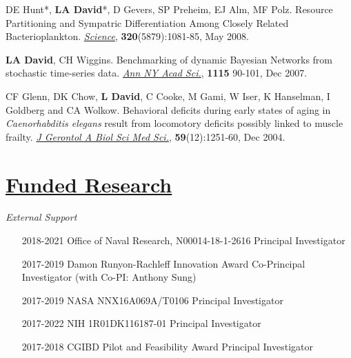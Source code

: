 \documentclass[overlapped,line,11pt]{res}
\begin{document}
\begin{resume}
\begin{revnumerate}[26]
\vspace*{1mm}
\item {DE Hunt*, \textbf{LA David}*, D Gevers, SP Preheim, EJ Alm, MF
Polz.  Resource Partitioning and Sympatric Differentiation Among
Closely Related Bacterioplankton.  \emph{\underline{Science}},
\textbf{320}(5879):1081-85, May 2008.}

\vspace*{1mm}
\item {\textbf{LA David}, CH Wiggins. Benchmarking of dynamic Bayesian
  Networks from stochastic time-series data. \emph{\underline{Ann NY Acad Sci.}},
  \textbf{1115} 90-101, Dec 2007.}

\vspace*{1mm}
\item {CF Glenn, DK Chow, \textbf{L David}, C Cooke, M Gami, W Iser, K
  Hanselman, I Goldberg and CA Wolkow. Behavioral deficits during
  early states of aging in {\em Caenorhabditis elegans} result from
  locomotory deficits possibly linked to muscle frailty. \emph{\underline{J
    Gerontol A Biol Sci Med Sci.}}, \textbf{59}(12):1251-60, Dec 2004.}
\end{revnumerate}

\section{\underline{\sc Funded Research}} 
\vspace{.1in}
\emph{External Support}
\vspace{.1in}

\begin{itemize}[leftmargin=2cm, style=sameline]

\item[2018-2021] Office of Naval Research, N00014-18-1-2616
  \newline Principal Investigator

\item[2017-2019] Damon Runyon-Rachleff Innovation Award 
  \newline Co-Principal Investigator (with Co-PI:
  Anthony Sung)

\item[2017-2019] NASA NNX16A069A/T0106 \newline Principal Investigator


\item[2017-2022] NIH 1R01DK116187-01 \newline
  Principal Investigator

\item[2017-2018] CGIBD Pilot and Feasibility Award \newline Principal
  Investigator



\end{itemize}
\end{resume}
\end{document}
